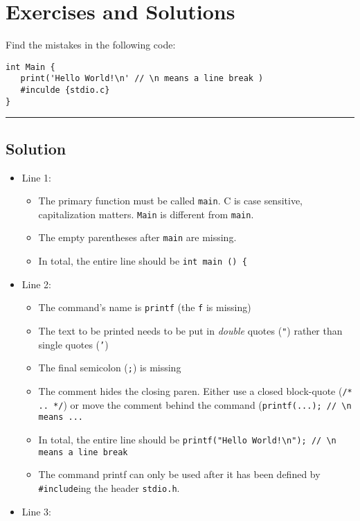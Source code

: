 \newpage
\section{Exercises and Solutions}
Find the mistakes in the following code:
\begin{codebox}[exo2-1.c]
\begin{verbatim}
int Main {
   print('Hello World!\n' // \n means a line break )
   #inculde {stdio.c}
}
\end{verbatim}
\end{codebox}

\rule{\linewidth}{0.1mm}
\subsection*{Solution}
\begin{itemize}
\item Line 1:
	\begin{itemize}
	\item The primary function must be called \texttt{main}. C is case sensitive, \ie capitalization matters. \texttt{Main} is different from \texttt{main}.
	\item The empty parentheses after \texttt{main} are missing.
	\item In total, the entire line should be \texttt{int main () \{}
	\end{itemize}
\item Line 2:
	\begin{itemize}
	\item The command's name is \texttt{printf} (the \texttt{f} is missing)
	\item The text to be printed needs to be put in \emph{double} quotes (\texttt{"}) rather than single quotes (\texttt{'})
	\item The final semicolon (\texttt{;}) is missing
	\item The comment hides the closing paren. Either use a closed block-quote (\texttt{/* .. */}) or move the comment behind the command (\texttt{printf(...); // \textbackslash n means ...}
	\item In total, the entire line should be \texttt{printf("Hello World!\textbackslash n"); // \textbackslash n means  a line break}
	\item The command printf can only be used after it has been defined by \texttt{\#include}ing the header \texttt{stdio.h}.
	\end{itemize}
\item Line 3:
	\begin{itemize}

\end{itemize}
\end{itemize}
